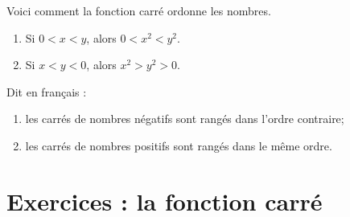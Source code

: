 \begin{Aretenir}
    Voici comment la fonction carré ordonne les nombres.
    \begin{enumerate}
        \item
            Si \( 0<x<y\), alors \( 0<x^2<y^2\).
        \item
            Si \( x<y<0\), alors \( x^2>y^2>0\).
    \end{enumerate}

    Dit en français :
    \begin{enumerate}
        \item
            les carrés de nombres négatifs sont rangés dans l’ordre contraire;
        \item
            les carrés de nombres positifs sont rangés dans le même ordre.
    \end{enumerate}
\end{Aretenir}

\section{Exercices : la fonction carré}


